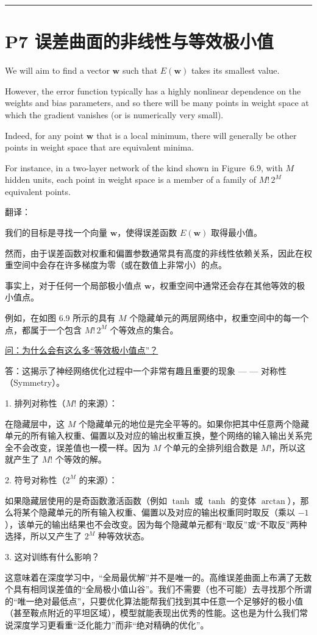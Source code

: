 \documentclass{article}
\begin{document}
\noindent\rule{\linewidth}{0.4pt}
 
\section{P7 误差曲面的非线性与等效极小值}

We will aim to find a vector $\mathbf{w}$ such that $E(\mathbf{w})$ takes its smallest value. 

However, the error function typically has a highly nonlinear dependence on the weights and bias parameters, and so there will be many points in weight space at which the gradient vanishes (or is numerically very small). 

Indeed, for any point $\mathbf{w}$ that is a local minimum, there will generally be other points in weight space that are equivalent minima. 

For instance, in a two-layer network of the kind shown in Figure~6.9, with $M$ hidden units, each point in weight space is a member of a family of $M!\,2^M$ equivalent points.

{\color{red}
翻译：

我们的目标是寻找一个向量 $\mathbf{w}$，使得误差函数 $E(\mathbf{w})$ 取得最小值。

然而，由于误差函数对权重和偏置参数通常具有高度的非线性依赖关系，因此在权重空间中会存在许多梯度为零（或在数值上非常小）的点。

事实上，对于任何一个局部极小值点 $\mathbf{w}$，权重空间中通常还会存在其他等效的极小值点。

例如，在如图 6.9 所示的具有 $M$ 个隐藏单元的两层网络中，权重空间中的每一个点，都属于一个包含 $M!\,2^M$ 个等效点的集合。
}

{\color{blue}
\underline{问：为什么会有这么多“等效极小值点”？}

答：这揭示了神经网络优化过程中一个非常有趣且重要的现象 — — 对称性（Symmetry）。

1. 排列对称性（$M!$ 的来源）：

在隐藏层中，这 $M$ 个隐藏单元的地位是完全平等的。如果你把其中任意两个隐藏单元的所有输入权重、偏置以及对应的输出权重互换，整个网络的输入输出关系完全不会改变，误差值也一模一样。因为 $M$ 个单元的全排列组合数是 $M!$，所以这就产生了 $M!$ 个等效的解。

2. 符号对称性（$2^M$ 的来源）：

如果隐藏层使用的是奇函数激活函数（例如 $\tanh$ 或 $\tanh$ 的变体 $\arctan$），那么将某个隐藏单元的所有输入权重、偏置以及对应的输出权重同时取反（乘以 $-1$），该单元的输出结果也不会改变。因为每个隐藏单元都有“取反”或“不取反”两种选择，所以又产生了 $2^M$ 种等效状态。

3. 这对训练有什么影响？

这意味着在深度学习中，“全局最优解”并不是唯一的。高维误差曲面上布满了无数个具有相同误差值的“全局极小值山谷”。我们不需要（也不可能）去寻找那个所谓的“唯一绝对最低点”，只要优化算法能帮我们找到其中任意一个足够好的极小值（甚至鞍点附近的平坦区域），模型就能表现出优秀的性能。这也是为什么我们常说深度学习更看重“泛化能力”而非“绝对精确的优化”。

}
\end{document}

